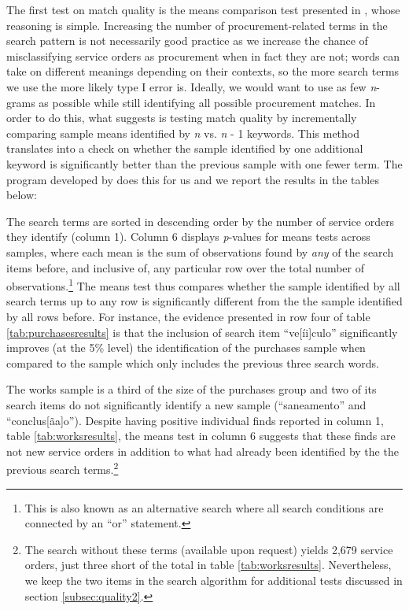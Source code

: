 \documentclass[11pt]{article}
\begin{document}
The first test on match quality is the means comparison test presented in \citet{AssumpcaotextfindDataDrivenText2018}, whose reasoning is simple. Increasing the number of procurement-related terms in the search pattern is not necessarily good practice as we increase the chance of misclassifying service orders as procurement when in fact they are not; words can take on different meanings depending on their contexts, so the more search terms we use the more likely type I error is. Ideally, we would want to use as few \emph{n}-grams as possible while still identifying all possible procurement matches. In order to do this, what \citet{AssumpcaotextfindDataDrivenText2018} suggests is testing match quality by incrementally comparing sample means identified by \emph{n} vs. \emph{n} - 1 keywords. This method translates into a check on whether the sample identified by one additional keyword is significantly better than the previous sample with one fewer term. The program developed by \citet{AssumpcaotextfindDataDrivenText2018} does this for us and we report the results in the tables below:



The search terms are sorted in descending order by the number of service orders they identify (column 1). Column 6 displays \emph{p}-values for means tests across samples, where each mean is the sum of observations found by \emph{any} of the search items before, and inclusive of, any particular row over the total number of observations.\footnote{This is also known as an alternative search where all search conditions are connected by an ``or'' statement.} The means test thus compares whether the sample identified by all search terms up to any row is significantly different from the the sample identified by all rows before. For instance, the evidence presented in row four of table \ref{tab:purchasesresults} is that the inclusion of search item ``ve{[}íi{]}culo'' significantly improves (at the 5\% level) the identification of the purchases sample when compared to the sample which only includes the previous three search words.



The works sample is a third of the size of the purchases group and two of its search items do not significantly identify a new sample (``saneamento'' and ``conclus{[}ãa{]}o''). Despite having positive individual finds reported in column 1, table \ref{tab:worksresults}, the means test in column 6 suggests that these finds are not new service orders in addition to what had already been identified by the the previous search terms.\footnote{The search without these terms (available upon request) yields 2,679 service orders, just three short of the total in table \ref{tab:worksresults}. Nevertheless, we keep the two items in the search algorithm for additional tests discussed in section \ref{subsec:quality2}.}
\end{document}
